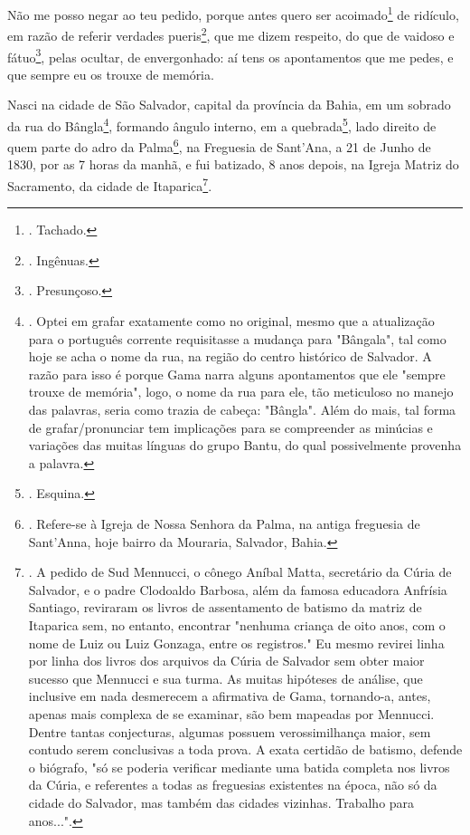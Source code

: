 Não me posso negar ao teu pedido, porque antes quero ser
acoimado\footnote{. Tachado.} de ridículo, em razão de referir verdades
pueris\footnote{. Ingênuas.}, que me dizem respeito, do que de vaidoso e
fátuo\footnote{. Presunçoso.}, pelas ocultar, de envergonhado: aí tens
os apontamentos que me pedes, e que sempre eu os trouxe de memória.

Nasci na cidade de São Salvador, capital da província da Bahia, em um
sobrado da rua do Bângla\footnote{. Optei em grafar exatamente como no
  original, mesmo que a atualização para o português corrente
  requisitasse a mudança para "Bângala", tal como hoje se acha o nome da
  rua, na região do centro histórico de Salvador. A razão para isso é
  porque Gama narra alguns apontamentos que ele "sempre trouxe de
  memória", logo, o nome da rua para ele, tão meticuloso no manejo das
  palavras, seria como trazia de cabeça: "Bângla". Além do mais, tal
  forma de grafar/pronunciar tem implicações para se compreender as
  minúcias e variações das muitas línguas do grupo Bantu, do qual
  possivelmente provenha a palavra.}, formando ângulo interno, em a
quebrada\footnote{. Esquina.}, lado direito de quem parte do adro da
Palma\footnote{. Refere-se à Igreja de Nossa Senhora da Palma, na antiga
  freguesia de Sant'Anna, hoje bairro da Mouraria, Salvador, Bahia.}, na
Freguesia de Sant'Ana, a 21 de Junho de 1830, por as 7 horas da manhã, e
fui batizado, 8 anos depois, na Igreja Matriz do Sacramento, da cidade
de Itaparica\footnote{. A pedido de Sud Mennucci, o cônego Aníbal Matta,
  secretário da Cúria de Salvador, e o padre Clodoaldo Barbosa, além da
  famosa educadora Anfrísia Santiago, reviraram os livros de
  assentamento de batismo da matriz de Itaparica sem, no entanto,
  encontrar "nenhuma criança de oito anos, com o nome de Luiz ou Luiz
  Gonzaga, entre os registros." Eu mesmo revirei linha por linha dos
  livros dos arquivos da Cúria de Salvador sem obter maior sucesso que
  Mennucci e sua turma. As muitas hipóteses de análise, que inclusive em
  nada desmerecem a afirmativa de Gama, tornando-a, antes, apenas mais
  complexa de se examinar, são bem mapeadas por Mennucci. Dentre tantas
  conjecturas, algumas possuem verossimilhança maior, sem contudo serem
  conclusivas a toda prova. A exata certidão de batismo, defende o
  biógrafo, "só se poderia verificar mediante uma batida completa nos
  livros da Cúria, e referentes a todas as freguesias existentes na
  época, não só da cidade do Salvador, mas também das cidades vizinhas.
  Trabalho para anos...".}.

